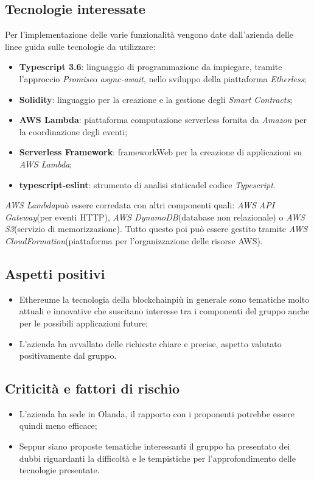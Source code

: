 \subsection{Tecnologie interessate}
    Per l'implementazione delle varie funzionalità vengono date dall'azienda delle linee guida sulle tecnologie da utilizzare:
    \begin{itemize}
        \item \textbf{Typescript 3.6}\glo: linguaggio di programmazione da impiegare, tramite l'approccio \textit{Promise}\glosp o \textit{async-await}\glosp, nello sviluppo della piattaforma \textit{Etherless};
        \item \textbf{Solidity}\glo: linguaggio per la creazione e la gestione degli \textit{Smart Contracts}\glo;
        \item \textbf{AWS Lambda}\glo: piattaforma computazione serverless fornita da \textit{Amazon} per la coordinazione degli eventi;
        \item \textbf{Serverless Framework}\glo: framework\glosp Web per la creazione di applicazioni su \textit{AWS Lambda}\glo;
        \item \textbf{typescript-eslint}\glo: strumento di analisi statica\glosp del codice \textit{Typescript}\glo.
    \end{itemize}
    \textit{AWS Lambda}\glosp può essere corredata con altri componenti quali: \textit{AWS API Gateway}\glosp (per eventi HTTP\glo), \textit{AWS DynamoDB}\glosp (database non relazionale\glo)
    o \textit{AWS S3}\glosp (servizio di memorizzazione). Tutto questo poi può essere gestito tramite \textit{AWS CloudFormation}\glosp (piattaforma per l'organizzazione delle
    risorse AWS).
\subsection{Aspetti positivi}
\begin{itemize}
    \item Ethereum\glosp e la tecnologia della blockchain\glosp più in generale sono tematiche molto attuali e innovative che suscitano interesse tra i componenti del gruppo
    anche per le possibili applicazioni future;
    \item L'azienda ha avvallato delle richieste chiare e precise, aspetto valutato positivamente dal gruppo.
\end{itemize}
\subsection{Criticità e fattori di rischio}
\begin{itemize}
    \item L'azienda ha sede in Olanda, il rapporto con i proponenti potrebbe essere quindi meno efficace;
    \item Seppur siano proposte tematiche interessanti il gruppo ha presentato dei dubbi riguardanti la difficoltà e le tempistiche per l'approfondimento
    delle tecnologie presentate.
\end{itemize}
